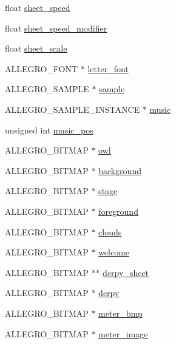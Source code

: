 \begin{DoxyCompactItemize}
float \hyperlink{structLevel_a41db1345ac158898450907010a49748f}{sheet\-\_\-speed}
\item 
float \hyperlink{structLevel_a3cae10fd441bcc14b6a47dd5fedafa59}{sheet\-\_\-speed\-\_\-modifier}
\item 
float \hyperlink{structLevel_a267a140bd3de1fc3f23a88623de425ed}{sheet\-\_\-scale}
\item 
A\-L\-L\-E\-G\-R\-O\-\_\-\-F\-O\-N\-T $\ast$ \hyperlink{structLevel_a69e6eae14648fd488a1dec0f55e4d293}{letter\-\_\-font}
\item 
A\-L\-L\-E\-G\-R\-O\-\_\-\-S\-A\-M\-P\-L\-E $\ast$ \hyperlink{structLevel_a234fa7b9ec35dd360e4e3c48a944fc7d}{sample}
\item 
A\-L\-L\-E\-G\-R\-O\-\_\-\-S\-A\-M\-P\-L\-E\-\_\-\-I\-N\-S\-T\-A\-N\-C\-E $\ast$ \hyperlink{structLevel_a41c6aae8f508e078b02c291e1d6f8e67}{music}
\item 
unsigned int \hyperlink{structLevel_a13e322deb3298846260af31324e5b492}{music\-\_\-pos}
\item 
A\-L\-L\-E\-G\-R\-O\-\_\-\-B\-I\-T\-M\-A\-P $\ast$ \hyperlink{structLevel_af504e3f628040bc2a2913a50253e856d}{owl}
\item 
A\-L\-L\-E\-G\-R\-O\-\_\-\-B\-I\-T\-M\-A\-P $\ast$ \hyperlink{structLevel_a4b4dd31284206502977b3d5b95d52abc}{background}
\item 
A\-L\-L\-E\-G\-R\-O\-\_\-\-B\-I\-T\-M\-A\-P $\ast$ \hyperlink{structLevel_ad412b858a4e688114dd89a44ecb005bb}{stage}
\item 
A\-L\-L\-E\-G\-R\-O\-\_\-\-B\-I\-T\-M\-A\-P $\ast$ \hyperlink{structLevel_a26c758ccdc7404a3ee0e766d1cbbf0be}{foreground}
\item 
A\-L\-L\-E\-G\-R\-O\-\_\-\-B\-I\-T\-M\-A\-P $\ast$ \hyperlink{structLevel_a27d34b57b66d4e7f733cb6a5cc16ff18}{clouds}
\item 
A\-L\-L\-E\-G\-R\-O\-\_\-\-B\-I\-T\-M\-A\-P $\ast$ \hyperlink{structLevel_a575fec7686bd94b5c35b15d73296c977}{welcome}
\item 
A\-L\-L\-E\-G\-R\-O\-\_\-\-B\-I\-T\-M\-A\-P $\ast$$\ast$ \hyperlink{structLevel_a0e02f3a5674a2ad3c23de22b6a4ed044}{derpy\-\_\-sheet}
\item 
A\-L\-L\-E\-G\-R\-O\-\_\-\-B\-I\-T\-M\-A\-P $\ast$ \hyperlink{structLevel_ae33832497116b7a0c184959bbde21ee5}{derpy}
\item 
A\-L\-L\-E\-G\-R\-O\-\_\-\-B\-I\-T\-M\-A\-P $\ast$ \hyperlink{structLevel_a4e78a54cbf3cdcc804f65acb03cef0b3}{meter\-\_\-bmp}
\item 
A\-L\-L\-E\-G\-R\-O\-\_\-\-B\-I\-T\-M\-A\-P $\ast$ \hyperlink{structLevel_a371c97dfa3d564a19648cb1b72edbf60}{meter\-\_\-image}
$$
\end{DoxyCompactItemize}

